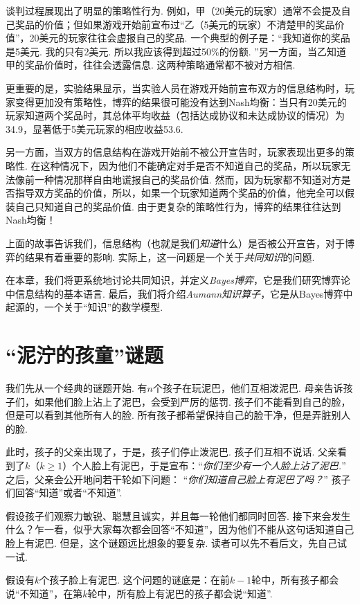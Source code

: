 谈判过程展现出了明显的策略性行为. 例如，甲（20美元的玩家）通常不会提及自己奖品的价值；但如果游戏开始前宣布过“乙（5美元的玩家）不清楚甲的奖品价值”，20美元的玩家往往会虚报自己的奖品. 一个典型的例子是：“我知道你的奖品是5美元. 我的只有2美元. 所以我应该得到超过50\%的份额. ”另一方面，当乙知道甲的奖品价值时，往往会透露信息. 这两种策略通常都不被对方相信. 

更重要的是，实验结果显示，当实验人员在游戏开始前宣布双方的信息结构时，玩家变得更加没有策略性，博弈的结果很可能没有达到Nash均衡：当只有20美元的玩家知道两个奖品时，其总体平均收益（包括达成协议和未达成协议的情况）为34.9，显著低于5美元玩家的相应收益53.6. 

另一方面，当双方的信息结构在游戏开始前不被公开宣告时，玩家表现出更多的策略性. 在这种情况下，因为他们不能确定对手是否不知道自己的奖品，所以玩家无法像前一种情况那样自由地谎报自己的奖品价值. 然而，因为玩家都不知道对方是否指导双方奖品的价值，所以，如果一个玩家知道两个奖品的价值，他完全可以假装自己只知道自己的奖品价值. 由于更复杂的策略性行为，博弈的结果往往达到Nash均衡！

上面的故事告诉我们，信息结构（也就是我们\textit{知道}什么）是否被公开宣告，对于博弈的结果有着重要的影响. 实际上，这一问题是一个关于\textit{共同知识}的问题. 

在本章，我们将更系统地讨论共同知识，并定义\textit{Bayes博弈}，它是我们研究博弈论中信息结构的基本语言. 最后，我们将介绍\textit{Aumann知识算子}，它是从Bayes博弈中起源的，一个关于“知识”的数学模型. 


\section{“泥泞的孩童”谜题}

我们先从一个经典的谜题开始. 有$n$个孩子在玩泥巴，他们互相泼泥巴. 母亲告诉孩子们，如果他们脸上沾上了泥巴，会受到严厉的惩罚. 孩子们不能看到自己的脸，但是可以看到其他所有人的脸. 所有孩子都希望保持自己的脸干净，但是弄脏别人的脸. 

此时，孩子的父亲出现了，于是，孩子们停止泼泥巴. 孩子们互相不说话. 父亲看到了$k$（$k\geq 1$）个人脸上有泥巴，于是宣布：“\textit{你们至少有一个人脸上沾了泥巴.}” 之后，父亲会公开地问若干轮如下问题： “\textit{你们知道自己脸上有泥巴了吗？}” 孩子们回答“知道”或者“不知道”. 

假设孩子们观察力敏锐、聪慧且诚实，并且每一轮他们都同时回答. 接下来会发生什么？乍一看，似乎大家每次都会回答“不知道”，因为他们不能从这句话知道自己脸上有泥巴. 但是，这个谜题远比想象的要复杂. 读者可以先不看后文，先自己试一试. 

假设有$k$个孩子脸上有泥巴. 这个问题的谜底是：在前$k-1$轮中，所有孩子都会说“不知道”，在第$k$轮中，所有脸上有泥巴的孩子都会说“知道”. 

